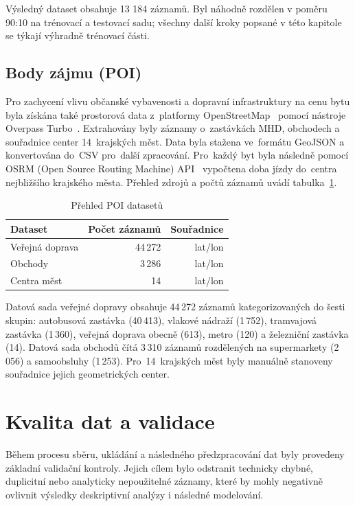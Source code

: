 Výsledný dataset obsahuje 13 184 záznamů. Byl náhodně rozdělen v poměru 90:10 na trénovací a testovací sadu; všechny další kroky popsané v této kapitole se týkají výhradně trénovací části.

\subsection{Body zájmu (POI)}
Pro zachycení vlivu občanské vybavenosti a dopravní infrastruktury na cenu bytu byla získána také prostorová data z~platformy OpenStreetMap~\cite{OpenStreetMap} pomocí nástroje Overpass Turbo~\cite{OverpassTurbo}. Extrahovány byly záznamy o~zastávkách MHD, obchodech a souřadnice center 14~krajských měst. Data byla stažena ve~formátu GeoJSON a konvertována do~CSV pro~další zpracování. Pro~každý byt byla následně pomocí OSRM (Open Source Routing Machine) API~\cite{OSRM} vypočtena doba jízdy do~centra nejbližšího krajského města. Přehled zdrojů a počtů záznamů uvádí tabulka~\ref{tab:poi_overview}.

\begin{table}[ht]
\centering
\caption{Přehled POI datasetů}
\label{tab:poi_overview}
\begin{tabular}{lrr}
\toprule
Dataset & Počet záznamů & Souřadnice \\
\midrule
Veřejná doprava & 44\,272 & lat/lon \\
Obchody & 3\,286 & lat/lon \\
Centra měst & 14 & lat/lon \\
\bottomrule
\end{tabular}
\end{table}

Datová sada veřejné dopravy obsahuje 44\,272 záznamů kategorizovaných do šesti skupin: autobusová zastávka (40\,413), vlakové nádraží (1\,752), tramvajová zastávka (1\,360), veřejná doprava obecně (613), metro (120) a železniční zastávka (14). Datová sada obchodů čítá 3\,310 záznamů rozdělených na supermarkety (2\,056) a samoobsluhy (1\,253). Pro~14~krajských měst byly manuálně stanoveny souřadnice jejich geometrických center.

\section{Kvalita dat a validace}
\label{sec:data_quality_validation}

Během procesu sběru, ukládání a následného předzpracování dat byly provedeny základní validační kontroly. Jejich cílem bylo odstranit technicky chybné, duplicitní nebo analyticky nepoužitelné záznamy, které by mohly negativně ovlivnit výsledky deskriptivní analýzy i následné modelování.

